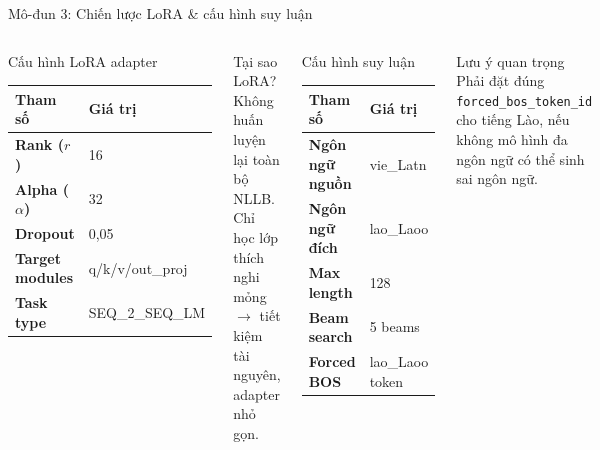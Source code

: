 ﻿\documentclass[aspectratio=169, 11pt]{beamer}
\begin{document}
\begin{frame}{Mô-đun 3: Chiến lược LoRA \& cấu hình suy luận}
    \begin{columns}[T]
        \begin{block}{Cấu hình LoRA adapter}
            \begin{tabular}{>{\small\bfseries}l >{\small}l}
                \toprule
                Tham số & Giá trị \\
                \midrule
                Rank ($r$) & 16 \\
                Alpha ($\alpha$) & 32 \\
                Dropout & 0,05 \\
                Target modules & q/k/v/out\_proj \\
                Task type & SEQ\_2\_SEQ\_LM \\
                \bottomrule
            \end{tabular}
        \end{block}
        \vspace{0.15cm}
        \begin{alertblock}{\small Tại sao LoRA?}
            \scriptsize Không huấn luyện lại toàn bộ NLLB. Chỉ học lớp thích nghi mỏng $\rightarrow$ tiết kiệm tài nguyên, adapter nhỏ gọn.
        \end{alertblock}

        \begin{block}{Cấu hình suy luận}
            \begin{tabular}{>{\small\bfseries}l >{\small}l}
                \toprule
                Tham số & Giá trị \\
                \midrule
                Ngôn ngữ nguồn & vie\_Latn \\
                Ngôn ngữ đích & lao\_Laoo \\
                Max length & 128 \\
                Beam search & 5 beams \\
                Forced BOS & lao\_Laoo token \\
                \bottomrule
            \end{tabular}
        \end{block}
        \vspace{0.15cm}
        \begin{exampleblock}{\small Lưu ý quan trọng}
            \scriptsize Phải đặt đúng \texttt{forced\_bos\_token\_id} cho tiếng Lào, nếu không mô hình đa ngôn ngữ có thể sinh sai ngôn ngữ.
        \end{exampleblock}
    \end{columns}
\end{frame}
\end{document}
